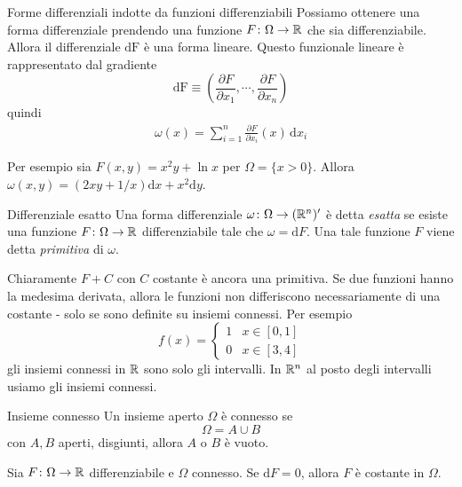 \documentclass[a4paper]{article}
\begin{document}
\pagebreak

\begin{radioactive}
\begin{snippetexample}{Forme differenziali indotte da funzioni differenziabili}
    Possiamo ottenere una forma differenziale prendendo una funzione
    \(F \colon \Omega \to \mathbb{R}\) che sia differenziabile.
    Allora il differenziale \(\text{dF}\) è una forma lineare.
    Questo funzionale lineare è rappresentato dal gradiente
    \[
        \text{dF} \equiv
        \left(
            \frac{\partial F}{\partial x_1},
            \cdots,
            \frac{\partial F}{\partial x_n}
        \right)
    \]
    quindi
    \begin{align*}
        \omega(x) = \sum_{i=1}^n
        \frac{\partial F}{\partial x_i}(x) \,\text{d}x_i
    \end{align*}
\end{snippetexample}
\end{radioactive}

\begin{radioactive}
Per esempio sia \(F(x,y) = x^2y + \ln x\)
per \(\Omega = \{ x>0\}\).
Allora \(\omega(x,y) = (2xy + 1/x)\text{d}x +x^2\text{d}y\).
\end{radioactive}

\begin{radioactive}
\begin{snippetdefinition}{Differenziale esatto}
    Una forma differenziale \(\omega \colon \Omega \to (\mathbb{R}^n)'\)
    è detta \emph{esatta} se esiste una funzione
    \(F \colon \Omega \to \mathbb{R}\) differenziabile
    tale che \(\omega = \text{d} F\).
    Una tale funzione \(F\) viene detta \emph{primitiva} di \(\omega\).
\end{snippetdefinition}
\end{radioactive}

\begin{radioactive}
Chiaramente \(F + C\) con \(C\) costante è ancora una primitiva.
Se due funzioni hanno la medesima derivata, allora le funzioni
non differiscono necessariamente di una costante - solo se sono
definite su insiemi connessi.
Per esempio
\[
    f(x) = \begin{cases}
        1 & x\in [0,1] \\
        0 & x\in[3,4]
    \end{cases}
\]
gli insiemi connessi in \(\mathbb{R}\) sono solo gli intervalli.
In \(\mathbb{R}^n\) al posto degli intervalli usiamo gli insiemi connessi.

\begin{snippetdefinition}{Insieme connesso}
    Un insieme aperto \(\Omega\) è connesso se
    \[
        \Omega = A \cup B
    \]
    con \(A,B\) aperti, disgiunti, allora \(A\) o \(B\) è vuoto.
\end{snippetdefinition}

\begin{snippetproposition}{}
    Sia \(F\colon \Omega \to \mathbb{R}\) differenziabile
    e \(\Omega\) connesso.
    Se \(\text{d}F = 0\), allora \(F\) è costante in \(\Omega\).
\end{snippetproposition}
\end{radioactive}
\end{document}
